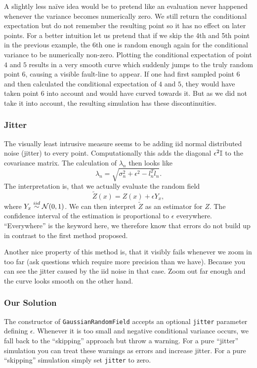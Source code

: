 A slightly less naïve idea would be to pretend like an evaluation never happened
whenever the variance becomes numerically zero. We still return the conditional
expectation but do not remember the resulting point so it has no effect on later
points. For a better intuition let us pretend that if we skip the 4th and 5th point
in the previous example, the 6th one is random enough again for the conditional
variance to be numerically non-zero. Plotting the conditional expectation of
point \(4\) and \(5\) results in a very smooth curve which suddenly jumps
to the truly random point \(6\), causing a visible fault-line to appear. If one
had first sampled point \(6\) and then calculated the conditional expectation
of \(4\) and \(5\), they would have taken point \(6\) into account and would
have curved towards it. But as we did not take it into account, the resulting
simulation has these discontinuities.

\subsubsection{Jitter}

The visually least intrusive measure seems to be adding iid normal distributed
noise (jitter) to every point. Computationally this adds the diagonal \(\epsilon^2
\mathbb{I}\) to the covariance matrix. The calculation of \(\lambda_n\) then
looks like
\[
	\lambda_n = \sqrt{\sigma_n^2 + \epsilon^2 - l_n^T l_n}.
\]
The interpretation is, that we actually evaluate the random field
\[
	\tilde{Z}(x) = Z(x) + \epsilon Y_x,
\]
where \(Y_x\overset{iid}\sim\mathcal{N}(0,1)\). We can then interpret \(\tilde{Z}\)
as an estimator for \(Z\). The confidence interval of the estimation is
proportional to \(\epsilon\) everywhere. ``Everywhere'' is the keyword here, we
therefore know that errors do not build up in contrast to the first method
proposed.

Another nice property of this method is, that it visibly fails whenever we zoom
in too far (ask questions which require more precision than we have). Because
you can see the jitter caused by the iid noise in that case. Zoom out far enough
and the curve looks smooth on the other hand.

\subsubsection{Our Solution}

The constructor of \texttt{GaussianRandomField} accepts an optional 
\texttt{jitter} parameter defining \(\epsilon\). Whenever it is too
small and negative conditional variance occurs, we fall back to the ``skipping''
approach but throw a warning. For a pure ``jitter'' simulation you can treat these
warnings as errors and increase jitter. For a pure ``skipping'' simulation
simply set \texttt{jitter} to zero.

